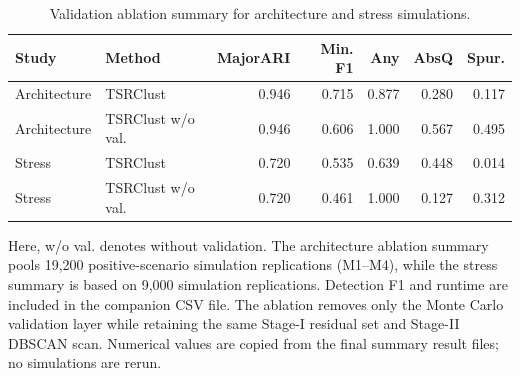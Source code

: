 \begin{table}[!htbp]
\caption{Validation ablation summary for architecture and stress simulations.}
\label{tab:supp-validation-ablation}
\centering
\tiny
\setlength{\tabcolsep}{1pt}
\begin{tabular}{llrrrrr}
\hline
Study & Method & MajorARI & Min. F1 & Any & AbsQ & Spur. \\
\hline
Architecture & TSRClust & 0.946 & 0.715 & 0.877 & 0.280 & 0.117 \\
Architecture & TSRClust w/o val. & 0.946 & 0.606 & 1.000 & 0.567 & 0.495 \\
Stress & TSRClust & 0.720 & 0.535 & 0.639 & 0.448 & 0.014 \\
Stress & TSRClust w/o val. & 0.720 & 0.461 & 1.000 & 0.127 & 0.312 \\
\hline
\end{tabular}
\begin{flushleft}\footnotesize Here, w/o val. denotes without validation. The architecture ablation summary pools 19,200 positive-scenario simulation replications (M1--M4), while the stress summary is based on 9,000 simulation replications. Detection F1 and runtime are included in the companion CSV file. The ablation removes only the Monte Carlo validation layer while retaining the same Stage-I residual set and Stage-II DBSCAN scan. Numerical values are copied from the final summary result files; no simulations are rerun.\end{flushleft}
\end{table}
